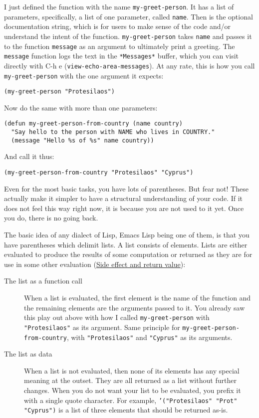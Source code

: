\documentclass[11pt]{ctexart}
\begin{document}
I just defined the function with the name \texttt{my-greet-person}. It has a list of parameters, specifically, a list of one parameter, called \texttt{name}. Then is the optional documentation string, which is for users to make sense of the code and/or understand the intent of the function. \texttt{my-greet-person} takes \texttt{name} and passes it to the function \texttt{message} as an argument to ultimately print a greeting. The \texttt{message} function logs the text in the \texttt{*Messages*} buffer, which you can visit directly with C-h e (\texttt{view-echo-area-messages}). At any rate, this is how you call \texttt{my-greet-person} with the one argument it expects:

\begin{verbatim}
(my-greet-person "Protesilaos")
\end{verbatim}

Now do the same with more than one parameters:

\begin{verbatim}
(defun my-greet-person-from-country (name country)
  "Say hello to the person with NAME who lives in COUNTRY."
  (message "Hello %s of %s" name country))
\end{verbatim}

And call it thus:

\begin{verbatim}
(my-greet-person-from-country "Protesilaos" "Cyprus")
\end{verbatim}

Even for the most basic tasks, you have lots of parentheses. But fear not! These actually make it simpler to have a structural understanding of your code. If it does not feel this way right now, it is because you are not used to it yet. Once you do, there is no going back.

The basic idea of any dialect of Lisp, Emacs Lisp being one of them, is that you have parentheses which delimit lists. A list consists of elements. Lists are either evaluated to produce the results of some computation or returned as they are for use in some other evaluation (\hyperref[sec:org2689823]{Side effect and return value}):

\begin{description}
\item[{The list as a function call}] When a list is evaluated, the first element is the name of the function and the remaining elements are the arguments passed to it. You already saw this play out above with how I called \texttt{my-greet-person} with \texttt{"Protesilaos"} as its argument. Same principle for \texttt{my-greet-person-from-country}, with \texttt{"Protesilaos"} and \texttt{"Cyprus"} as its arguments.

\item[{The list as data}] When a list is not evaluated, then none of its elements has any special meaning at the outset. They are all returned as a list without further changes. When you do not want your list to be evaluated, you prefix it with a single quote character. For example, \texttt{'("Protesilaos" "Prot" "Cyprus")} is a list of three elements that should be returned as-is.
\end{description}
\end{document}
